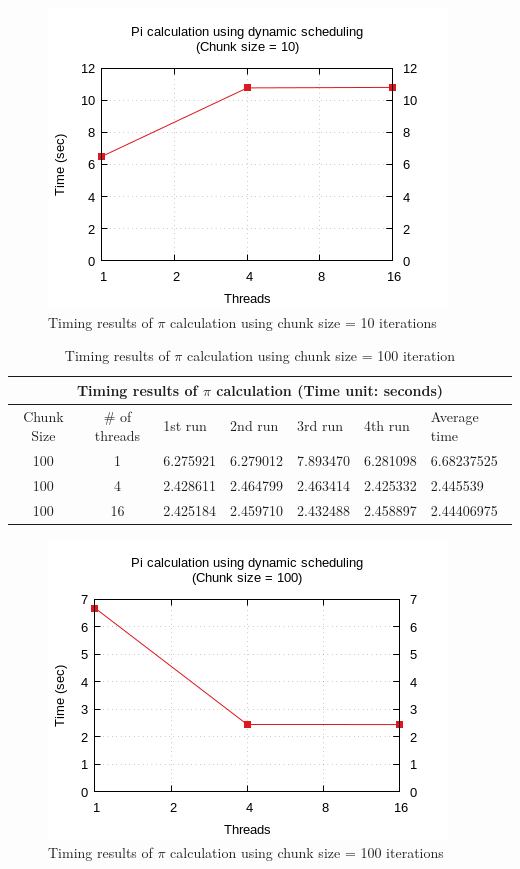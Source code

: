 \documentclass{article}
\begin{document}
\begin{figure}[htbp]
  \centering
  \includegraphics[width=0.55\columnwidth]{../ex1/plots/pi_c10.png}
  \caption{Timing results of $\pi$ calculation using chunk size = 10 iterations}
\end{figure}


\begin{table}[htbp]
  \centering
    \begin{tabular}{|c c||l l l l| l|} 
    \hline
    \multicolumn{7}{|c|}{Timing results of $\pi$ calculation (Time unit: seconds)} \\
    \hline
    Chunk Size & \# of threads & 1st run & 2nd run & 3rd run & 4th run & Average time\\ [0.5ex] 
    \hline\hline
    100 & 1 & 6.275921 & 6.279012 & 7.893470 & 6.281098 & 6.68237525 \\
    \hline
    100 & 4 & 2.428611 & 2.464799 & 2.463414 & 2.425332 & 2.445539 \\
    \hline
    100 & 16 & 2.425184 & 2.459710 & 2.432488 & 2.458897 & 2.44406975 \\ [1ex]
    \hline
    \end{tabular}
  \caption{Timing results of $\pi$ calculation using chunk size = 100 iteration}
\end{table}

\begin{figure}[htbp]
  \centering
  \includegraphics[width=0.55\columnwidth]{../ex1/plots/pi_c100.png}
  \caption{Timing results of $\pi$ calculation using chunk size = 100 iterations}
\end{figure}
\end{document}
